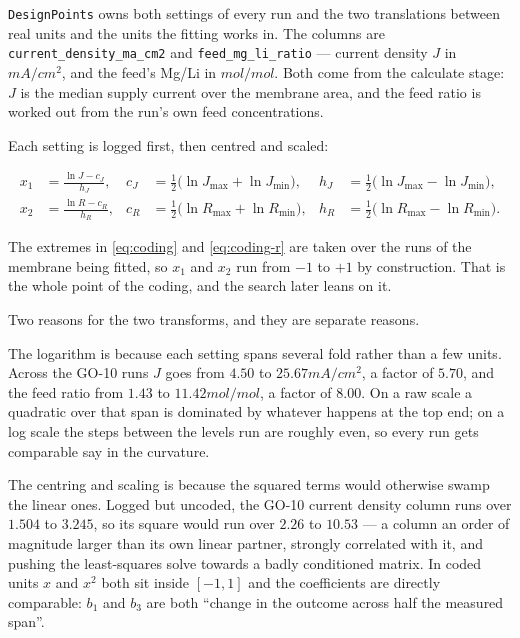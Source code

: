 \texttt{DesignPoints} owns both settings of every run and the two translations between real
units and the units the fitting works in. The columns are
\texttt{current\_density\_ma\_cm2} and \texttt{feed\_mg\_li\_ratio} --- current density $J$ in
$\unit{mA/cm^2}$, and the feed's Mg/Li in $\unit{mol/mol}$. Both come from the calculate stage:
$J$ is the median supply current over the membrane area, and the feed ratio is worked out from
the run's own feed concentrations.

Each setting is logged first, then centred and scaled:

\begin{align}
  \label{eq:coding}
  x_1 &= \frac{\ln J - c_J}{h_J}, &
  c_J &= \tfrac{1}{2}\bigl(\ln J_{\max} + \ln J_{\min}\bigr), &
  h_J &= \tfrac{1}{2}\bigl(\ln J_{\max} - \ln J_{\min}\bigr), \\
  \label{eq:coding-r}
  x_2 &= \frac{\ln R - c_R}{h_R}, &
  c_R &= \tfrac{1}{2}\bigl(\ln R_{\max} + \ln R_{\min}\bigr), &
  h_R &= \tfrac{1}{2}\bigl(\ln R_{\max} - \ln R_{\min}\bigr).
\end{align}

The extremes in \eqref{eq:coding} and \eqref{eq:coding-r} are taken over the runs of the
membrane being fitted, so $x_1$ and $x_2$ run from $-1$ to $+1$ by construction. That is the
whole point of the coding, and the search later leans on it.

Two reasons for the two transforms, and they are separate reasons.

The logarithm is because each setting spans several fold rather than a few units. Across the
GO-10 runs $J$ goes from $4.50$ to $25.67\unit{mA/cm^2}$, a factor of $5.70$, and the feed ratio
from $1.43$ to $11.42\unit{mol/mol}$, a factor of $8.00$. On a raw scale a quadratic over that
span is dominated by whatever happens at the top end; on a log scale the steps between the
levels run are roughly even, so every run gets comparable say in the curvature.

The centring and scaling is because the squared terms would otherwise swamp the linear ones.
Logged but uncoded, the GO-10 current density column runs over $1.504$ to $3.245$, so its
square would run over $2.26$ to $10.53$ --- a column an order of magnitude larger than its own
linear partner, strongly correlated with it, and pushing the least-squares solve towards a
badly conditioned matrix. In coded units $x$ and $x^2$
both sit inside $[-1,1]$ and the coefficients are directly comparable: $b_1$ and $b_3$ are both
``change in the outcome across half the measured span''.

